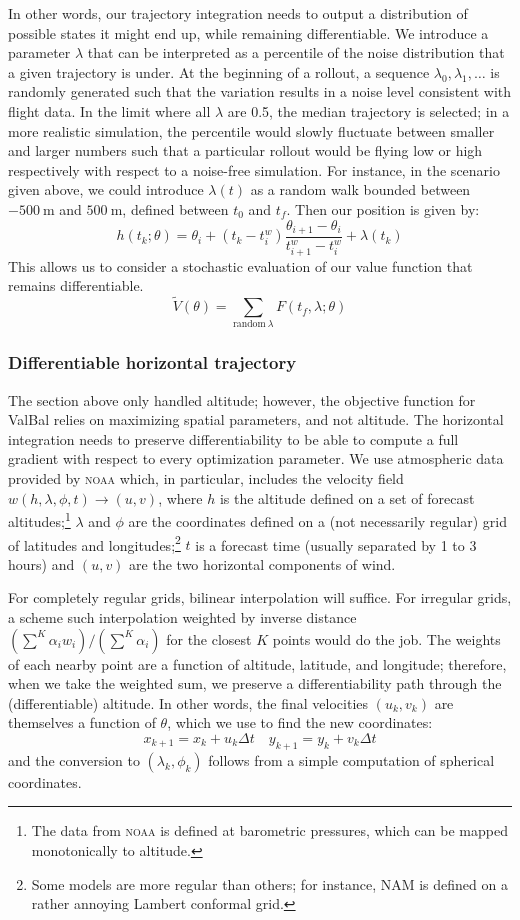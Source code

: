 \documentclass[11pt]{scrartcl} %
\begin{document}
In other words, our trajectory integration needs to output a distribution of possible states it might end up, while remaining differentiable. We introduce a parameter $\lambda$ that can be interpreted as a percentile of the noise distribution that a given trajectory is under. At the beginning of a rollout, a sequence $\lambda_0, \lambda_1, \dots$ is randomly generated such that the variation results in a noise level consistent with flight data. In the limit where all $\lambda$ are 0.5, the median trajectory is selected; in a more realistic simulation, the percentile would slowly fluctuate between smaller and larger numbers such that a particular rollout would be flying low or high respectively with respect to a noise-free simulation. For instance, in the scenario given above, we could introduce $\lambda(t)$ as a random walk bounded between $-500~\textrm{m}$ and $500~\textrm{m}$, defined between $t_0$ and $t_f$. Then our position is given by:
\[h(t_k; \theta) = \theta_i + (t_k - t_i^w) \frac{\theta_{i+1}-\theta_i}{t_{i+1}^w - t^w_i} + \lambda(t_k)\]
This allows us to consider a stochastic evaluation of our value function that remains differentiable.
\[\tilde V(\theta)=\sum_{\textrm{random}~\lambda} F(t_f, \lambda; \theta)\]

\subsubsection{Differentiable horizontal trajectory} \label{sec:horizontal}
The section above only handled altitude; however, the objective function for ValBal relies on maximizing spatial parameters, and not altitude. The horizontal integration needs to preserve differentiability to be able to compute a full gradient with respect to every optimization parameter. We use atmospheric data provided by \textsc{noaa} which, in particular, includes the velocity field $w(h, \lambda, \phi, t)\to(u, v)$, where $h$ is the altitude defined on a set of forecast altitudes;\footnote{The data from \textsc{noaa} is defined at barometric pressures, which can be mapped monotonically to altitude.} $\lambda$ and $\phi$ are the coordinates defined on a (not necessarily regular) grid of latitudes and longitudes;\footnote{Some models are more regular than others; for instance, NAM is defined on a rather annoying Lambert conformal grid.} $t$ is a forecast time (usually separated by 1 to 3 hours) and $(u, v)$ are the two horizontal components of wind.

For completely regular grids, bilinear interpolation will suffice. For irregular grids, a scheme such interpolation weighted by inverse distance $(\sum^K \alpha_i w_i)/(\sum^K \alpha_i)$ for the closest $K$ points would do the job. The weights of each nearby point are a function of altitude, latitude, and longitude; therefore, when we take the weighted sum, we preserve a differentiability path through the (differentiable) altitude. In other words, the final velocities $(u_k, v_k)$ are themselves a function of $\theta$, which we use to find the new coordinates:
\[x_{k+1} = x_k + u_k\Delta t\quad y_{k+1} = y_k + v_k\Delta t\]
and the conversion to $(\lambda_k, \phi_k)$ follows from a simple computation of spherical coordinates. 
\end{document}
